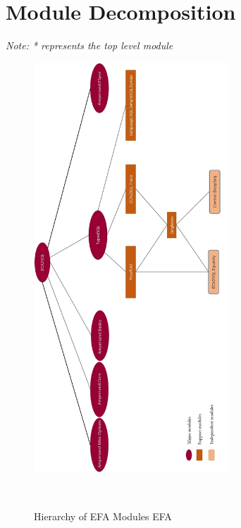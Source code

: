 \documentclass[12pt]{report}
\begin{document}
\section{Module Decomposition}
\textit{Note: * represents the top level module}
\begin{figure}[!htb]
    \centering
    \includegraphics[width=0.65\textwidth]{../figures/projTree}
    \caption{Hierarchy of EFA Modules
        EFA}~\label{fig:figure2} 
\end{figure}
\end{document}
